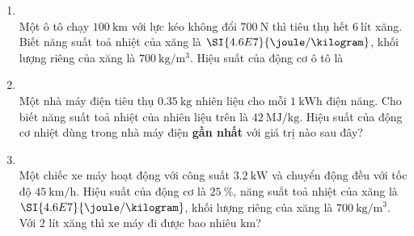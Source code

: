 \begin{enumerate}[label=\bfseries Câu \arabic*:, leftmargin=1.7cm]
\item {}\\
Một ô tô chạy $\SI{100}{\kilo\meter}$ với lực kéo không đổi $\SI{700}{\newton}$ thì tiêu thụ hết $\SI{6}{\text{lít}}$ xăng. Biết năng suất toả nhiệt của xăng là $\SI{4.6E7}{\joule/\kilogram}$, khối lượng riêng của xăng là $\SI{700}{\kilogram/\meter^3}$. Hiệu suất của động cơ ô tô là

\item {}\\
Một nhà máy điện tiêu thụ $\SI{0.35}{\kilogram}$ nhiên liệu cho mỗi $\SI{1}{\kilo\watt\hour}$ điện năng. Cho biết năng suất toả nhiệt của nhiên liệu trên là $\SI{42}{\mega\joule/\kilogram}$. Hiệu suất của động cơ nhiệt dùng trong nhà máy điện \textbf{gần nhất} với giá trị nào sau đây?

\item {}\\
Một chiếc xe máy hoạt động với công suất $\SI{3.2}{\kilo\watt}$ và chuyển động đều với tốc độ $\SI{45}{\kilo\meter/\hour}$. Hiệu suất của động cơ là $\SI{25}{\percent}$, năng suất toả nhiệt của xăng là $\SI{4.6E7}{\joule/\kilogram}$, khối lượng riêng của xăng là $\SI{700}{\kilogram/\meter^3}$. Với 2 lít xăng thì xe máy đi được bao nhiêu $\si{\kilo\meter}$?


\end{enumerate}
